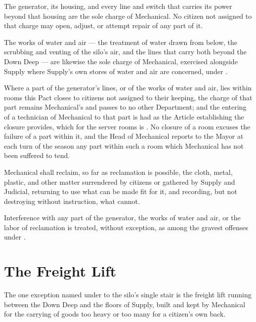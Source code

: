 \begin{clauses}
\item The generator, its housing, and every line and switch that carries its power beyond that housing are the sole charge of Mechanical. No citizen not assigned to that charge may open, adjust, or attempt repair of any part of it.
\item The works of water and air --- the treatment of water drawn from below, the scrubbing and venting of the silo's air, and the lines that carry both beyond the Down Deep --- are likewise the sole charge of Mechanical, exercised alongside Supply where Supply's own stores of water and air are concerned, under .
\item Where a part of the generator's lines, or of the works of water and air, lies within rooms this Pact closes to citizens not assigned to their keeping, the charge of that part remains Mechanical's and passes to no other Department; and the entering of a technician of Mechanical to that part is had as the Article establishing the closure provides, which for the server rooms is . No closure of a room excuses the failure of a part within it, and the Head of Mechanical reports to the Mayor at each turn of the season any part within such a room which Mechanical has not been suffered to tend.
\item Mechanical shall reclaim, so far as reclamation is possible, the cloth, metal, plastic, and other matter surrendered by citizens or gathered by Supply and Judicial, returning to use what can be made fit for it, and recording, but not destroying without instruction, what cannot.
\item Interference with any part of the generator, the works of water and air, or the labor of reclamation is treated, without exception, as among the gravest offenses under .
\end{clauses}

\section{The Freight Lift}
\label{sec:mechanical:freight-lift}

The one exception named under  to the silo's single stair is the freight lift running between the Down Deep and the floors of Supply, built and kept by Mechanical for the carrying of goods too heavy or too many for a citizen's own back.

